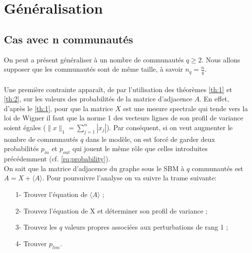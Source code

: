 \section{Généralisation}
\subsection{Cas avec n communautés}
On peut a présent généraliser à un nombre de communautés $q \geq 2$.
Nous allons supposer que les communautés sont de même taille, à savoir $n_q = \frac{n}{q}$.
\paragraph{}\label{rq:contrainte model}
Une première contrainte apparaît, de par l'utilisation des théorèmes \ref{th:1} et \ref{th:2}, sur les valeurs des probabilités de la matrice d'adjacence $A$.
En effet, d'après le \autoref{th:1}, pour que la matrice $X$ est une mesure spectrale qui tende vers la loi de Wigner il faut que la norme 1 des vecteurs lignes de son profil de variance soient égales ($\parallel x \parallel_1 = \sum_{j=1}^{n}|x_j|$).
Par conséquent, si on veut augmenter le nombre de communautés $q$ dans le modèle, on est forcé de garder deux probabilités $p_{in}$ et $p_{out}$ qui jouent le même rôle que celles introduites précédemment (cf. \ref{rq:probability}).\\

On sait que la matrice d’adjacence du graphe sous le SBM à $q$ communautés est $A = X + \langle A \rangle$.  
Pour poursuivre l'analyse on va suivre la trame suivante:
\begin{itemize}
	\item[1-] Trouver l'équation de $\langle A \rangle$ ;
	\item[2-] Trouvez l'équation de X et déterminer son profil de variance ;
	\item[3-] Trouvez les $q$ valeurs propres associées aux perturbations de rang 1 ;
	\item[4-] Trouver $p_{lim}$.\\
\end{itemize}

